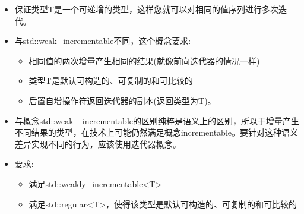 \begin{itemize}
\item
保证类型T是一个可递增的类型，这样您就可以对相同的值序列进行多次迭代。

\item
与std::weak\_incrementable不同，这个概念要求:

\begin{itemize}
\item
相同值的两次增量产生相同的结果(就像前向迭代器的情况一样)

\item
类型T是默认可构造的、可复制的和可比较的

\item
后置自增操作符返回迭代器的副本(返回类型为T)。
\end{itemize}

\item
与概念std::weak \_incrementable的区别纯粹是语义上的区别，所以于增量产生不同结果的类型，在技术上可能仍然满足概念incrementable。要针对这种语义差异实现不同的行为，应该使用迭代器概念。

\item
要求:
\begin{itemize}
\item
满足std::weakly\_incrementable<T>

\item
满足std::regular<T>，使得该类型是默认可构造的、可复制的和可比较的
\end{itemize}
\end{itemize}
